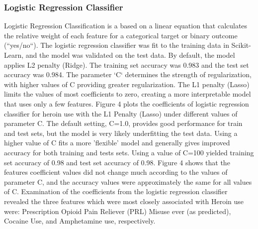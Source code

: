 \documentclass[sigconf]{acmart}
\begin{document}
\subsubsection{Logistic Regression Classifier}
 
Logistic Regression Classification is a based on a linear equation that 
calculates the relative weight of each feature for a categorical target or 
binary outcome (``yes/no``)\cite{raschka17}. The logistic regression classifier 
was fit to the training data in Scikit-Learn, and the model was validated on 
the test data. By default, the model applies L2 penalty (Ridge). The training 
set accuracy was 0.983 and the test set accuracy was 0.984. The parameter `C` 
determines the strength of regularization, with higher values of C providing
greater regularization. The L1 penalty (Lasso) limits the values of most 
coefficients to zero, creating a more interpretable model that uses only a 
few features. Figure 4 plots the coefficients of logistic regression classifier 
for heroin use with the L1 Penalty (Lasso) under different values of parameter 
C. The default setting, C=1.0, provides good performance for train and test 
sets, but the model is very likely underfitting the test data. Using a higher
value of C fits a more 'flexible' model and generally gives improved accuracy 
for both training and tests sets. Using a value of C=100 yielded training set
accuracy of 0.98 and test set accuracy of 0.98. Figure 4 shows that the 
features coefficient values did not change much according to the values of
parameter C, and the accuracy values were approximately the same for all 
values of C. Examination of the coefficients from the logistic regression 
classifier revealed the three features which were most closely associated 
with Heroin use were: Prescription Opioid Pain Reliever (PRL) Misuse ever 
(as predicted), Cocaine Use, and Amphetamine use, respectively.
\end{document}

